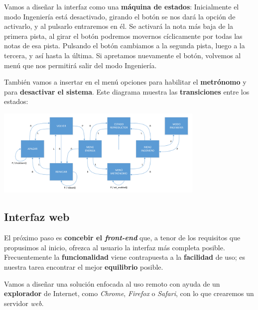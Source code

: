 \documentclass[10pt,a4paper]{article}
\begin{document}
	Vamos a diseñar la interfaz como una \textbf{máquina de estados}: Inicialmente el modo Ingeniería está desactivado, girando el botón se nos dará la opción de activarlo, y al pulsarlo entraremos en él. Se activará la nota más baja de la primera pista, al girar el botón podremos movernos cíclicamente por todas las notas de esa pista. Pulsando el botón cambiamos a la segunda pista, luego a la tercera, y así hasta la última. Si apretamos nuevamente el botón, volvemos al menú que nos permitirá salir del modo Ingeniería.
	
	También vamos a insertar en el menú opciones para habilitar el \textbf{metrónomo} y para \textbf{desactivar el sistema}. Este diagrama muestra las \textbf{transiciones} entre los estados:
	
	\begin{center}
		\includegraphics[width=0.75\textwidth]{images/engineer} 
	\end{center}
	
	
	\subsection{Interfaz web}
	
	El próximo paso es \textbf{concebir el \textit{front-end}} que, a tenor de los requisitos que propusimos al inicio, ofrezca al usuario la interfaz más completa posible. Frecuentemente la \textbf{funcionalidad} viene contrapuesta a la \textbf{facilidad} de uso; es nuestra tarea encontrar el mejor \textbf{equilibrio} posible.
	
	Vamos a diseñar una solución enfocada al uso remoto con ayuda de un \textbf{explorador} de Internet, como \textit{Chrome}, \textit{Firefox} o \textit{Safari}, con lo que crearemos un servidor \textit{web}.
	
\end{document}
